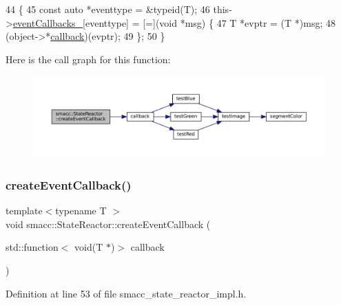 \begin{DoxyCode}
44 \{
45     \textcolor{keyword}{const} \textcolor{keyword}{auto} *eventtype = &\textcolor{keyword}{typeid}(T);
46     this->\hyperlink{classsmacc_1_1StateReactor_a63cce05c412f3699cc1b15af9aeaf8af}{eventCallbacks\_}[eventtype] = [=](\textcolor{keywordtype}{void} *msg) \{
47         T *evptr = (T *)msg;
48         (\textcolor{keywordtype}{object}->*\hyperlink{servers_2opencv__perception__node_2opencv__perception__node_8cpp_a050e697bd654facce10ea3f6549669b3}{callback})(evptr);
49     \};
50 \}
\end{DoxyCode}
Here is the call graph for this function\+:
\nopagebreak
\begin{figure}[H]
\begin{center}
\leavevmode
\includegraphics[width=350pt]{classsmacc_1_1StateReactor_a68482e08f6449694a0bcda843b14b376_cgraph}
\end{center}
\end{figure}
\mbox{\label{classsmacc_1_1StateReactor_ac6b3a604009e5a68123aed27e70cf2be}} 
\subsubsection{\texorpdfstring{create\+Event\+Callback()}{createEventCallback()}\hspace{0.1cm}{\footnotesize\ttfamily [2/2]}}
{\footnotesize\ttfamily template$<$typename T $>$ \\
void smacc\+::\+State\+Reactor\+::create\+Event\+Callback (\begin{DoxyParamCaption}\item[{std\+::function$<$ void(T $\ast$)$>$}]{callback }\end{DoxyParamCaption})}



Definition at line 53 of file smacc\+\_\+state\+\_\+reactor\+\_\+impl.\+h.



